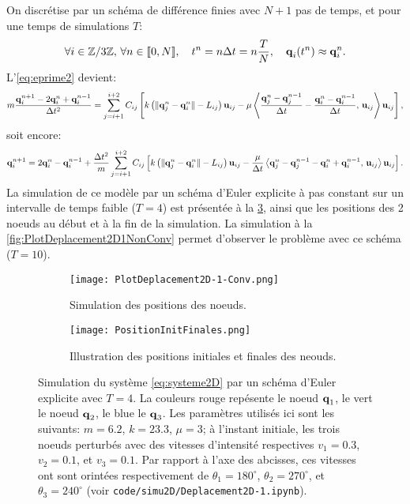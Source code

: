 On discrétise par un schéma de différence finies avec $N+1$ pas de temps, et pour une temps de simulations $T$:
$$
\forall i \in \mathbb{Z}/3\mathbb{Z}, \, \forall n \in [\![ 0,N ]\!], \quad  t^n = n\Delta t = n\frac{T}{N}, \quad \bm{\mathrm{q}}_i(t^n) \approx \bm{\mathrm{q}}_i^n.
$$
L'\cref{eq:eprime2} devient:
$$
m\frac{\bm{\mathrm{q}}_{i}^{n+1}-2\bm{\mathrm{q}}_{i}^{n}+\bm{\mathrm{q}}_{i}^{n-1}}{\Delta t^2} = \sum_{j=i+1}^{i+2}C_{ij}\left[ k \left( \Vert \bm{\mathrm{q}}_j^n - \bm{\mathrm{q}}_i^n \Vert - L_{ij} \right) \bm{\mathrm{u}}_{ij} - \mu \left\langle \frac{\bm{\mathrm{q}}_{j}^{n}-\bm{\mathrm{q}}_{j}^{n-1}}{\Delta t} - \frac{\bm{\mathrm{q}}_{i}^{n}-\bm{\mathrm{q}}_{i}^{n-1}}{\Delta t}, \, \bm{\mathrm{u}}_{ij} \right\rangle  \bm{\mathrm{u}}_{ij}  \right],
$$
soit encore:
\begin{align} \label{eq:systeme2D}
    \bm{\mathrm{q}}_{i}^{n+1} = 2\bm{\mathrm{q}}_{i}^{n}-\bm{\mathrm{q}}_{i}^{n-1} + \frac{\Delta t^2}{m} \sum_{j=i+1}^{i+2}C_{ij}\left[ k \left( \Vert \bm{\mathrm{q}}_j^n - \bm{\mathrm{q}}_i^n \Vert - L_{ij} \right) \bm{\mathrm{u}}_{ij} - \frac{\mu}{\Delta t} \left\langle \bm{\mathrm{q}}_{j}^{n}-\bm{\mathrm{q}}_{j}^{n-1} - \bm{\mathrm{q}}_{i}^{n}+\bm{\mathrm{q}}_{i}^{n-1}, \, \bm{\mathrm{u}}_{ij} \right\rangle  \bm{\mathrm{u}}_{ij}  \right].
\end{align}
La simulation de ce modèle par un schéma d'Euler explicite à pas constant sur un intervalle de temps faible ($T = 4$) est présentée à la \cref{fig:PlotDeplacement2D1Conv}, ainsi que les positions des 2 noeuds au début et à la fin de la simulation. La simulation à la \cref{fig:PlotDeplacement2D1NonConv} permet d'observer le problème avec ce schéma ($T = 10$).


\begin{figure}[!h]
    \begin{subfigure}[b]{0.7\textwidth}
        \centering
        \texttt{[image: PlotDeplacement2D-1-Conv.png]}
        \caption{Simulation des positions des noeuds.}
        \label{fig:dep}
    \end{subfigure}
    \begin{subfigure}[b]{0.7\textwidth}
        \centering
        \texttt{[image: PositionInitFinales.png]}
        \caption{Illustration des positions initiales et finales des neouds.}
        \label{fig:pos}
    \end{subfigure}
    \caption{Simulation du système \ref{eq:systeme2D} par un schéma d'Euler explicite avec $T = 4$. La couleurs rouge repésente le noeud $\bm{\mathrm{q}}_1$, le vert le noeud $\bm{\mathrm{q}}_2$, le blue le $\bm{\mathrm{q}}_3$. Les paramètres utilisés ici sont les suivants: $m=6.2$, $k=23.3$, $\mu=3$; à l'instant initiale, les trois noeuds perturbés avec des vitesses d'intensité respectives $v_1=0.3$, $v_2=0.1$, et $v_3=0.1$. Par rapport à l'axe des abcisses, ces vitesses ont sont orintées respectivement de $\theta_1=180^\circ$, $\theta_2=270^\circ$, et $\theta_3=240^\circ$ (voir \texttt{code/simu2D/Deplacement2D-1.ipynb}).}
    \label{fig:PlotDeplacement2D1Conv}
\end{figure}


